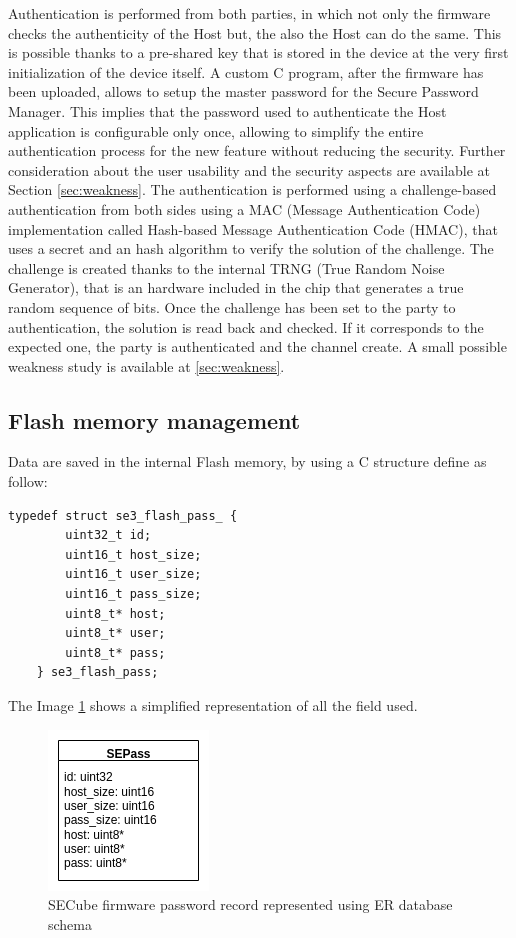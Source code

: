 Authentication is performed from both parties, in which not only the firmware checks the authenticity of the Host but, the also the Host can do the same. This is possible thanks to a pre-shared key that is stored in the device at the very first initialization of the device itself. A custom C program, after the firmware has been uploaded, allows to setup the master password for the Secure Password Manager. This implies that the password used to authenticate the Host application is configurable only once, allowing to simplify the entire authentication process for the new feature without reducing the security. Further consideration about the user usability and the security aspects are available at Section \ref{sec:weakness}.\newline\newline
The authentication is performed using a challenge-based authentication from both sides using a MAC (Message Authentication Code) implementation called Hash-based Message Authentication Code (HMAC), that uses a secret and an hash algorithm to verify the solution of the challenge. The challenge is created thanks to the internal TRNG (True Random Noise Generator), that is an hardware included in the chip that generates a true random sequence of bits. Once the challenge has been set to the party to authentication, the solution is read back and checked. If it corresponds to the expected one, the party is authenticated and the channel create. A small possible weakness study is available at \ref{sec:weakness}.

\subsection{Flash memory management}
Data are saved in the internal Flash memory, by using a C structure define as follow: 
\begin{lstlisting}[style=CStyle]
	typedef struct se3_flash_pass_ {
		uint32_t id;
		uint16_t host_size;
		uint16_t user_size;
		uint16_t pass_size;
		uint8_t* host;
		uint8_t* user;
		uint8_t* pass;
	} se3_flash_pass;
\end{lstlisting}
The Image \ref{fig:sepassrecord} shows a simplified representation of all the field used.
\begin{figure}[H]
	\centering
	\includegraphics[width=0.2\linewidth]{images/firmware/sepass_record}
	\caption{SECube firmware password record represented using ER database schema}
	\label{fig:sepassrecord}
\end{figure}

